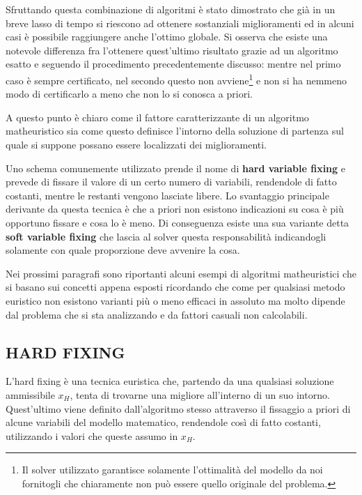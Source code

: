 \documentclass[11pt]{article}
\begin{document}
Sfruttando questa combinazione di algoritmi è stato dimostrato che già in un breve lasso di tempo si riescono ad ottenere sostanziali miglioramenti ed in alcuni casi è possibile raggiungere anche l'ottimo globale. Si osserva che esiste una notevole differenza fra l'ottenere quest'ultimo risultato grazie ad un algoritmo esatto e seguendo il procedimento precedentemente discusso: mentre nel primo caso è sempre certificato, nel secondo questo non avviene\footnote{Il solver utilizzato garantisce solamente l'ottimalità del modello da noi fornitogli che chiaramente non può essere quello originale del problema.} e non si ha nemmeno modo di certificarlo a meno che non lo si conosca a priori.

A questo punto è chiaro come il fattore caratterizzante di un algoritmo matheuristico sia come questo definisce l'intorno della soluzione di partenza sul quale si suppone possano essere localizzati dei miglioramenti. 

Uno schema comunemente utilizzato prende il nome di \textbf{hard variable fixing} e prevede di fissare il valore di un certo numero di variabili, rendendole di fatto costanti, mentre le restanti vengono lasciate libere. Lo svantaggio principale derivante da questa tecnica è che a priori non esistono indicazioni su cosa è più opportuno fissare e cosa lo è meno. Di conseguenza esiste una sua variante detta \textbf{soft variable fixing} che lascia al solver questa responsabilità indicandogli solamente con quale proporzione deve avvenire la cosa.

Nei prossimi paragrafi sono riportanti alcuni esempi di algoritmi matheuristici che si basano sui concetti appena esposti ricordando che come per qualsiasi metodo euristico non esistono varianti più o meno efficaci in assoluto ma molto dipende dal problema che si sta analizzando e da fattori casuali non calcolabili.

\subsection*{HARD FIXING}
\label{sec:HardFixingS}

L'hard fixing è una tecnica euristica che, partendo da una qualsiasi soluzione ammissibile \textbf{$x_H$}, tenta di trovarne una migliore all'interno di un suo intorno. Quest'ultimo viene definito dall'algoritmo stesso attraverso il fissaggio a priori di alcune variabili del modello matematico, rendendole così di fatto costanti, utilizzando i valori che queste assumo in $x_H$. 
\end{document}
